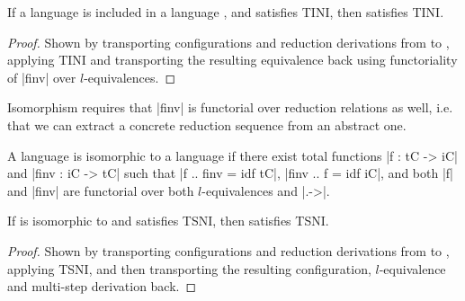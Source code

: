 \begin{theorem}
    If a language  is included in a language , and 
    satisfies TINI, then  satisfies TINI.
\end{theorem}

\begin{proof}
    Shown by transporting configurations and reduction derivations
    from  to , applying TINI and transporting the resulting
    equivalence back using functoriality of |finv| over $l$-equivalences.
\end{proof}

Isomorphism requires that |finv| is functorial over reduction relations
as well, i.e. that we can extract a concrete reduction sequence from an abstract one.

\begin{definition}
    A language  is
    isomorphic to a language  if there exist total functions
    |f : tC -> iC| and |finv : iC -> tC| such that |f .. finv = idf tC|, |finv .. f = idf iC|, and both |f| and |finv| are
    functorial over both $l$-equivalences and |.->|.
\end{definition}

\begin{theorem}
    If  is isomorphic to  and  satisfies TSNI, then
     satisfies TSNI.
\end{theorem}

\begin{proof}
    Shown by transporting configurations and reduction derivations from
     to , applying TSNI, and then transporting the
    resulting configuration, $l$-equivalence and multi-step derivation back.
\end{proof}



